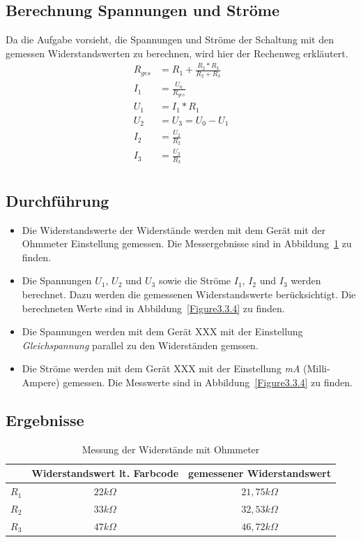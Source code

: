 \documentclass[12pt,a4paper,titlepage]{article}
\begin{document}
\subsection{Berechnung Spannungen und Str\"ome}
Da die Aufgabe vorsieht, die Spannungen und Str\"ome der Schaltung mit den gemessen Widerstandswerten zu berechnen, wird hier der Rechenweg erkl\"autert.
\begin{align*}
  R_{ges} &= R_1 + \frac{R_2*R_3}{R_2 + R_3}\\
  I_{1} &= \frac{U_0}{R_{ges}}\\
  U_{1} &= I_1 * R_1\\
  U_{2} &= U_{3} = U_0 - U_1\\
  I_2 &= \frac{U_2}{R_2}\\
  I_3 &= \frac{U_3}{R_3}\\
\end{align*}

\subsection{Durchf\"uhrung}
\begin{itemize}
  \item Die Widerstandswerte der Widerst\"ande werden mit dem Ger\"at mit der Ohmmeter Einstellung gemessen. Die Messergebnisse sind in Abbildung~\ref{Figure3.3.3} zu finden.
  \item Die Spannungen $U_1$, $U_2$ und $U_3$ sowie die Str\"ome $I_1$, $I_2$ und $I_3$ werden berechnet. Dazu werden die gemessenen Widerstandswerte ber\"ucksichtigt. Die berechneten Werte sind in Abbildung~\ref{Figure3.3.4} zu finden.
  \item Die Spannungen werden mit dem Ger\"at XXX mit der Einstellung \textit{Gleichspannung} parallel zu den Widerst\"anden gemssen.
  \item Die Str\"ome werden mit dem Ger\"at XXX mit der Einstellung \textit{mA} (Milli-Ampere) gemessen. Die Messwerte sind in Abbildung~\ref{Figure3.3.4} zu finden.
\end{itemize}

\subsection{Ergebnisse}
\begin{table}[H]
  \centering
  \begin{tabular}{|l|c|c|}
  \hline
     & Widerstandswert lt. Farbcode & gemessener Widerstandswert \\ \hline
  $R_1$ & $22 k\Omega$                    & $21,75 k\Omega$               \\ \hline
  $R_2$ & $33 k\Omega$                    & $32,53 k\Omega$               \\ \hline
  $R_3$ & $47 k\Omega$                    & $46,72 k\Omega$               \\ \hline
  \end{tabular}
  \caption{Messung der Widerst\"ande mit Ohmmeter}
  \label{Figure3.3.3}
\end{table}
\end{document}
